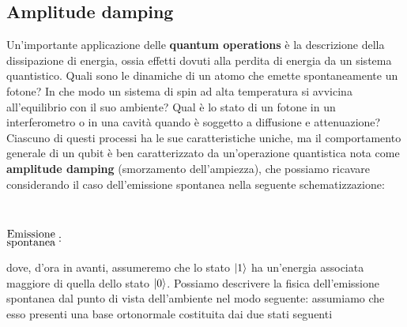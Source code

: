 \vspace{1cm}
\noindent{}

\subsection{Amplitude damping}
Un'importante applicazione delle \textbf{quantum operations} è la descrizione della dissipazione di energia, ossia effetti dovuti alla perdita di energia da un sistema quantistico. Quali sono le dinamiche di un atomo che emette spontaneamente un fotone? In che modo un sistema di spin ad alta temperatura si avvicina all'equilibrio con il suo ambiente? Qual è lo stato di un fotone in un interferometro o in una cavità quando è soggetto a diffusione e attenuazione? Ciascuno di questi processi ha le sue caratteristiche uniche, ma il comportamento generale di un qubit è ben caratterizzato da un'operazione quantistica nota come \textbf{amplitude damping} (smorzamento dell'ampiezza), che possiamo ricavare considerando il caso dell'emissione spontanea nella seguente schematizzazione:
\begin{center}
    $
        \begin{matrix}
             \\
             \\
            \begin{Large}\substack{\text{Emissione} \\ \text{spontanea}}\end{Large}: \\
        \end{matrix}
        $
\end{center}
\vspace{0.2cm}
dove, d'ora in avanti, assumeremo che lo stato $\ket{1}$ ha un'energia associata maggiore di quella dello stato $\ket{0}$. Possiamo descrivere la fisica dell’emissione spontanea dal punto di vista dell’ambiente nel modo seguente: assumiamo che esso presenti una base ortonormale costituita dai due stati seguenti
